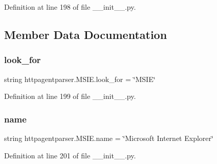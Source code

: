Definition at line 198 of file \+\_\+\+\_\+init\+\_\+\+\_\+.\+py.



\subsection{Member Data Documentation}
\hypertarget{classhttpagentparser_1_1_m_s_i_e_aad8e48c3628faa8c3e39ef48cf9838ec}{}\label{classhttpagentparser_1_1_m_s_i_e_aad8e48c3628faa8c3e39ef48cf9838ec} 
\subsubsection{\texorpdfstring{look\+\_\+for}{look\_for}}
{\footnotesize\ttfamily string httpagentparser.\+M\+S\+I\+E.\+look\+\_\+for = \char`\"{}M\+S\+IE\char`\"{}\hspace{0.3cm}{\ttfamily [static]}}



Definition at line 199 of file \+\_\+\+\_\+init\+\_\+\+\_\+.\+py.

\hypertarget{classhttpagentparser_1_1_m_s_i_e_ad82616487981705cef28058d0561bea3}{}\label{classhttpagentparser_1_1_m_s_i_e_ad82616487981705cef28058d0561bea3} 
\subsubsection{\texorpdfstring{name}{name}}
{\footnotesize\ttfamily string httpagentparser.\+M\+S\+I\+E.\+name = \char`\"{}Microsoft Internet Explorer\char`\"{}\hspace{0.3cm}{\ttfamily [static]}}



Definition at line 201 of file \+\_\+\+\_\+init\+\_\+\+\_\+.\+py.

\hypertarget{classhttpagentparser_1_1_m_s_i_e_a950e0dcb4710cb246ad8ec8fd7a44068}{}\label{classhttpagentparser_1_1_m_s_i_e_a950e0dcb4710cb246ad8ec8fd7a44068} 
